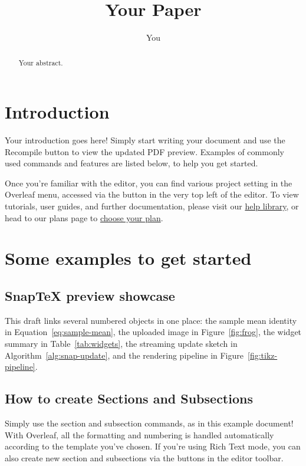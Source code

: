 \documentclass{article}
\title{Your Paper}
\author{You}
\begin{document}
\maketitle

\begin{abstract}
Your abstract.
\end{abstract}

\section{Introduction}

Your introduction goes here! Simply start writing your document and use the Recompile button to view the updated PDF preview. Examples of commonly used commands and features are listed below, to help you get started.

Once you're familiar with the editor, you can find various project setting in the Overleaf menu, accessed via the button in the very top left of the editor. To view tutorials, user guides, and further documentation, please visit our \href{https://www.overleaf.com/learn}{help library}, or head to our plans page to \href{https://www.overleaf.com/user/subscription/plans}{choose your plan}.


\section{Some examples to get started}

\subsection{SnapTeX preview showcase}

This draft links several numbered objects in one place: the sample mean identity in Equation~\eqref{eq:sample-mean}, the uploaded image in Figure~\ref{fig:frog}, the widget summary in Table~\ref{tab:widgets}, the streaming update sketch in Algorithm~\ref{alg:snap-update}, and the rendering pipeline in Figure~\ref{fig:tikz-pipeline}.

\subsection{How to create Sections and Subsections}

Simply use the section and subsection commands, as in this example document! With Overleaf, all the formatting and numbering is handled automatically according to the template you've chosen. If you're using Rich Text mode, you can also create new section and subsections via the buttons in the editor toolbar.
\end{document}
